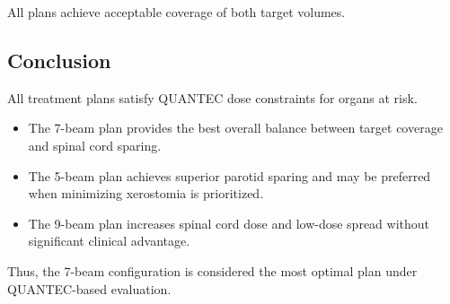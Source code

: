 All plans achieve acceptable coverage of both target volumes.

\subsection*{Conclusion}
All treatment plans satisfy QUANTEC dose constraints for organs at risk. 

\begin{itemize}
    \item The 7-beam plan provides the best overall balance between target coverage and spinal cord sparing.
    \item The 5-beam plan achieves superior parotid sparing and may be preferred when minimizing xerostomia is prioritized.
    \item The 9-beam plan increases spinal cord dose and low-dose spread without significant clinical advantage.
\end{itemize}

\noindent
Thus, the 7-beam configuration is considered the most optimal plan under QUANTEC-based evaluation.